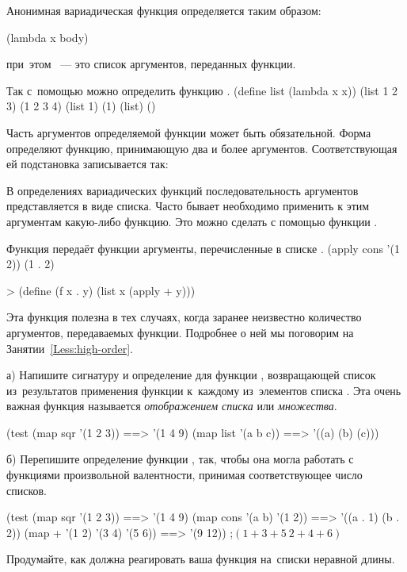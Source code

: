 Анонимная вариадическая функция определяется таким образом:
\begin{SchemeCode}[emph={x}]
        (lambda x body) %
\end{SchemeCode}
\noindent при~этом ~--- это список аргументов, переданных функции.

\begin{example}{%
Так с~помощью  можно определить функцию .}
\REPLin
  {(define list (lambda x x))}
\REPL
  {(list 1 2 3)}
  {(1 2 3 4)}
\REPL
  {(list 1)}
  {(1)}
\REPL
  {(list)}
  {()}
\end{example}

\label{variadic-rewrite}Часть аргументов определяемой функции может быть обязательной. Форма  определяют функцию, принимающую два и более аргументов. Соответствующая ей подстановка записывается так: 

В определениях вариадических функций последовательность аргументов представляется в виде списка. Часто бывает необходимо применить к этим аргументам какую-либо функцию. Это можно сделать с помощью функции .

\begin{example}{%
Функция  передаёт функции  аргументы, перечисленные в списке .}
\REPL
  {(apply cons '(1 2))}
  {(1 . 2)}
\begin{SchemeCode}
> (define (f x . y)
    (list x (apply + y)))
\end{SchemeCode}
\end{example}

Эта функция полезна в тех случаях, когда заранее неизвестно количество аргументов, передаваемых функции. Подробнее о ней мы поговорим на Занятии~\ref{Less:high-order}.

\begin{Assignment}
а) Напишите сигнатуру и определение для функции , возвращающей список из~результатов применения функции  к~каждому из~элементов списка . Эта очень важная функция называется \emph{отображением списка} или \emph{множества}.
\begin{Specification}
(test 
  (map sqr '(1 2 3))  ==> '(1 4 9)
  (map list '(a b c)) ==> '((a) (b) (c)))
\end{Specification}

б) Перепишите определение функции , так, чтобы она могла работать с функциями произвольной валентности, принимая соответствующее число списков.
\begin{Specification}
(test 
  (map sqr '(1 2 3))  ==> '(1 4 9)
  (map cons '(a b) '(1 2))    ==> '((a . 1) (b . 2))
  (map + '(1 2) '(3 4) '(5 6)) ==> '(9 12)) ;$(1+3+5\ 2+4+6)$
\end{Specification}

Продумайте, как должна реагировать ваша функция на~списки неравной длины.
\end{Assignment}



